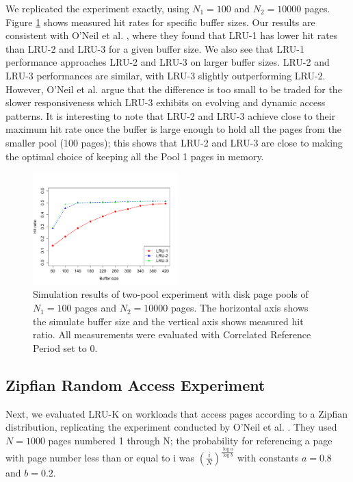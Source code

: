 We replicated the experiment exactly, using $N_1 = 100$ and $N_2 = 10000$ pages. Figure \ref{fig:two_pool} shows measured hit rates for specific buffer sizes. Our results are consistent with O'Neil et al. \cite{lruk}, where they found that LRU-1 has lower hit rates than LRU-2 and LRU-3 for a given buffer size. We also see that LRU-1 performance approaches LRU-2 and LRU-3 on larger buffer sizes. LRU-2 and LRU-3 performances are similar, with LRU-3 slightly outperforming LRU-2. However, O'Neil et al. argue that the difference is too small to be traded for the slower responsiveness which LRU-3 exhibits on evolving and dynamic access patterns. It is interesting to note that LRU-2 and LRU-3 achieve close to their maximum hit rate once the buffer is large enough to hold all the pages from the smaller pool (100 pages); this shows that LRU-2 and LRU-3 are close to making the optimal choice of keeping all the Pool 1 pages in memory.

\begin{figure}[t!]
    \centering
	\includegraphics[width=0.5\textwidth]{./figures/two_pool.pdf}
	\caption{Simulation results of two-pool experiment with disk page pools of $N_1 = 100$ pages and $N_2 = 10000$ pages. The horizontal axis shows the simulate buffer size and the vertical axis shows measured hit ratio. All measurements were evaluated with Correlated Reference Period set to 0.}
	\label{fig:two_pool}
\end{figure}


\subsection{Zipfian Random Access Experiment}

Next, we evaluated LRU-K on workloads that access pages according to a Zipfian distribution, replicating the experiment conducted by O'Neil et al. \cite{lruk}. They used $N = 1000$ pages numbered 1 through N; the probability for referencing a page with page number less than or equal to i was $\left(\frac{i}{N}\right)^\frac{\log{a}}{\log{b}}$ with constants $a = 0.8$ and $b = 0.2$.

